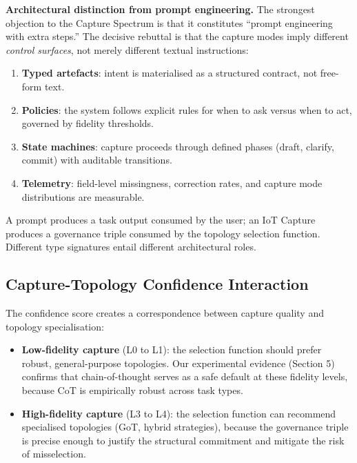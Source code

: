 \documentclass[11pt,a4paper]{article}
\providecommand{\tightlist}{%
  \setlength{\itemsep}{0pt}\setlength{\parskip}{0pt}}
\begin{document}
\textbf{Architectural distinction from prompt engineering.} The
strongest objection to the Capture Spectrum is that it constitutes
``prompt engineering with extra steps.'' The decisive rebuttal is that
the capture modes imply different \emph{control surfaces}, not merely
different textual instructions:

\begin{enumerate}
\def\labelenumi{\arabic{enumi}.}
\tightlist
\item
  \textbf{Typed artefacts}: intent is materialised as a structured
  contract, not free-form text.
\item
  \textbf{Policies}: the system follows explicit rules for when to ask
  versus when to act, governed by fidelity thresholds.
\item
  \textbf{State machines}: capture proceeds through defined phases
  (draft, clarify, commit) with auditable transitions.
\item
  \textbf{Telemetry}: field-level missingness, correction rates, and
  capture mode distributions are measurable.
\end{enumerate}

A prompt produces a task output consumed by the user; an IoT Capture
produces a governance triple consumed by the topology selection
function. Different type signatures entail different architectural
roles.

\subsection{Capture-Topology Confidence
Interaction}\label{capture-topology-confidence-interaction}

The confidence score creates a correspondence between capture quality
and topology specialisation:

\begin{itemize}
\tightlist
\item
  \textbf{Low-fidelity capture} (L0 to L1): the selection function
  should prefer robust, general-purpose topologies. Our experimental
  evidence (Section 5) confirms that chain-of-thought serves as a safe
  default at these fidelity levels, because CoT is empirically robust
  across task types.
\item
  \textbf{High-fidelity capture} (L3 to L4): the selection function can
  recommend specialised topologies (GoT, hybrid strategies), because the
  governance triple is precise enough to justify the structural
  commitment and mitigate the risk of misselection.
\end{itemize}
\end{document}
